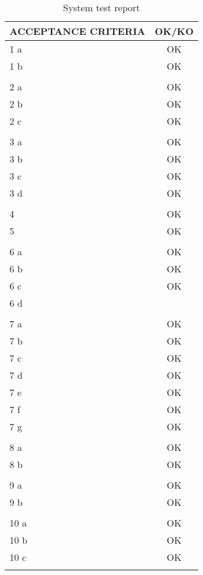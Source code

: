 \documentclass{article}
\begin{document}
\begin{enumerate}
\begin{table}
    \centering
\caption{System test report}
\label{tab:my_label}
    \begin{tabular}{|l|c|} \hline 
         ACCEPTANCE CRITERIA&OK/KO\\ \hline 
         1 a&OK\\ \hline 
         1 b&OK\\ \hline 
         &\\ \hline 
         2 a&OK\\ \hline 
         2 b&OK\\ \hline 
         2 c&OK\\ \hline 
         & \\ \hline 
         3 a& OK\\ \hline 
         3 b& OK\\ \hline 
         3 c& OK\\ \hline 
         3 d& OK\\ \hline 
         & \\ \hline 
         4& OK\\ \hline 
         5& OK\\ \hline 
         & \\ \hline 
         6 a&OK\\ \hline 
         6 b&OK\\ \hline 
         6 c&OK\\ \hline
         6 d&\\\hline
         & \\ \hline 
         7 a&OK\\ \hline 
         7 b&OK\\ \hline 
         7 c&OK\\ \hline
         7 d&OK\\ \hline
         7 e&OK\\ \hline 
         7 f&OK\\ \hline 
         7 g&OK\\ \hline
         &\\ \hline
         8 a&OK\\ \hline 
         8 b&OK\\ \hline 
         &\\ \hline
         9 a&OK\\ \hline 
         9 b&OK\\ \hline 
         &\\ \hline 
         10 a&OK\\ \hline 
         10 b&OK\\ \hline 
         10 c&OK\\ \hline 
 &\\\hline
    \end{tabular}
    
    
\end{table}


\end{enumerate}
\end{document}
